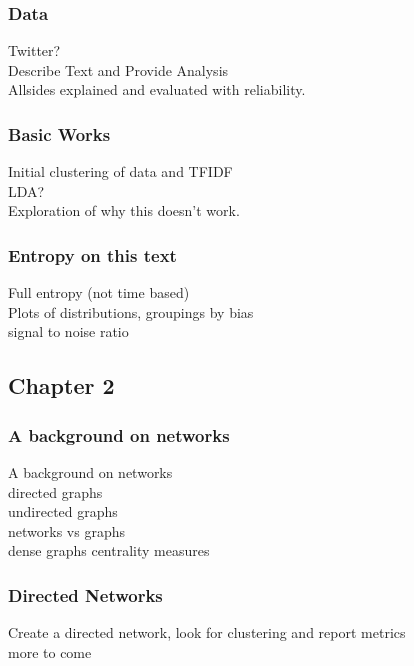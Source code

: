 \documentclass[12pt,a4paper]{article}
\begin{document}
\subsubsection{Data}
Twitter?\\
Describe Text and Provide Analysis\\
Allsides explained and evaluated with reliability. \\
\subsubsection{Basic Works}
Initial clustering of data and TFIDF \\
LDA? \\
Exploration of why this doesn't work.
\subsubsection{Entropy on this text}
Full entropy (not time based) \\
Plots of distributions, groupings by bias\\
signal to noise ratio
\subsection{Chapter 2}
\subsubsection{A background on networks}
 A background on networks \\
 directed graphs\\
 undirected graphs \\
 networks vs graphs \\
 dense graphs
 centrality measures
\subsubsection{Directed Networks}
Create a directed network, look for clustering and report metrics\\
more to come
\end{document}
